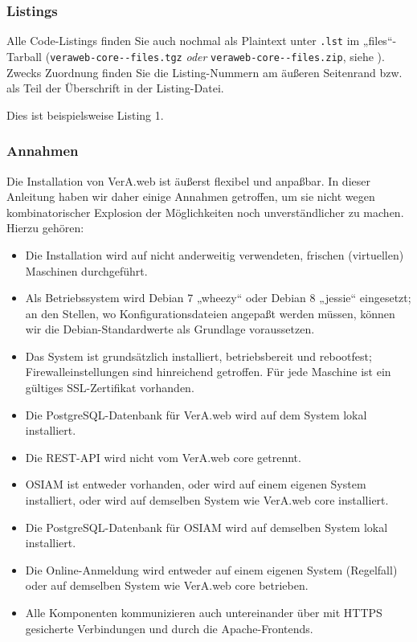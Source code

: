 \subsubsection{Listings}\label{subsubsec:aboutmanual-lst}

\begin{minipage}{\textwidth}
Alle Code-Listings finden Sie auch nochmal als Plaintext unter
\texttt{\jobname.lst} im „files“-Tarball
(\texttt{veraweb-core-\vwiaverssw{}-files.tgz} \emph{oder}
\texttt{veraweb-core-\vwiaverssw{}-files.zip}, siehe
).
Zwecks Zuordnung finden Sie die Listing-Nummern am äußeren
Seitenrand bzw. als Teil der Überschrift in der Listing-Datei.

\begin{lstdumpx}
Dies ist beispielsweise Listing 1.
\end{lstdumpx}
\end{minipage}

\subsubsection{Annahmen}\label{subsubsec:aboutmanual-assume}

Die Installation von VerA.web ist äußerst flexibel und anpaßbar.
In dieser Anleitung haben wir daher einige Annahmen getroffen, um
sie nicht wegen kombinatorischer Explosion der Möglichkeiten noch
unverständlicher zu machen. Hierzu gehören:\keinumbruch

\begin{itemize}
 \item{Die Installation wird auf nicht anderweitig verwendeten,
  frischen (virtuellen) Maschinen durchgeführt.}
 \item{Als Betriebssystem wird Debian 7 „wheezy“ oder Debian 8
  „jessie“ eingesetzt; an den Stellen, wo Konfigurationsdateien
  angepaßt werden müssen, können wir die Debian-Standardwerte
  als Grundlage voraussetzen.}
 \item{Das System ist grundsätzlich installiert, betriebsbereit
  und rebootfest; Firewalleinstellungen sind hinreichend getroffen.
  Für jede Maschine ist ein gültiges SSL-Zertifikat vorhanden.}
 \item{Die PostgreSQL-Datenbank für VerA.web wird auf dem System
  lokal installiert.}
 \item{Die REST-API wird nicht vom VerA.web core getrennt.}
\ifoa
 \item{OSIAM ist entweder vorhanden, oder wird auf einem eigenen
  System installiert, oder wird auf demselben System wie VerA.web
  core installiert.}
 \item{Die PostgreSQL-Datenbank für OSIAM wird auf demselben
  System lokal installiert.}
 \item{Die Online-Anmeldung wird entweder auf einem eigenen System
  (Regelfall) oder auf demselben System wie VerA.web core betrieben.}
 \item{Alle Komponenten kommunizieren auch untereinander über mit
  HTTPS gesicherte Verbindungen und durch die Apache-Frontends.}
\fi%
\end{itemize}

